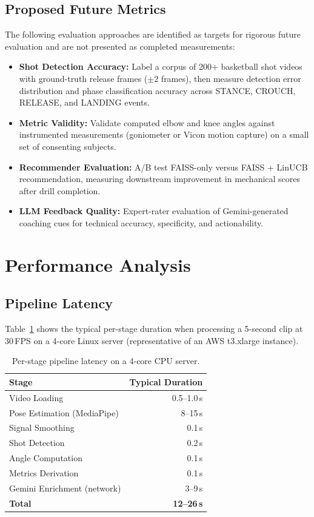 \subsection{Proposed Future Metrics}

The following evaluation approaches are identified as targets for rigorous future evaluation and are not presented as completed measurements:

\begin{itemize}
  \item \textbf{Shot Detection Accuracy:} Label a corpus of 200+ basketball shot videos with ground-truth release frames ($\pm 2$ frames), then measure detection error distribution and phase classification accuracy across STANCE, CROUCH, RELEASE, and LANDING events.
  \item \textbf{Metric Validity:} Validate computed elbow and knee angles against instrumented measurements (goniometer or Vicon motion capture) on a small set of consenting subjects.
  \item \textbf{Recommender Evaluation:} A/B test FAISS-only versus FAISS + LinUCB recommendation, measuring downstream improvement in mechanical scores after drill completion.
  \item \textbf{LLM Feedback Quality:} Expert-rater evaluation of Gemini-generated coaching cues for technical accuracy, specificity, and actionability.
\end{itemize}

\section{Performance Analysis}
\label{sec:performance}

\subsection{Pipeline Latency}

Table~\ref{tab:latency} shows the typical per-stage duration when processing a 5-second clip at 30\,FPS on a 4-core Linux server (representative of an AWS t3.xlarge instance).

\begin{table}[H]
  \centering
  \caption{Per-stage pipeline latency on a 4-core CPU server.}
  \label{tab:latency}
  \begin{tabular}{lr}
    \toprule
    \textbf{Stage} & \textbf{Typical Duration} \\
    \midrule
    Video Loading & 0.5--1.0\,s \\
    Pose Estimation (MediaPipe) & 8--15\,s \\
    Signal Smoothing & 0.1\,s \\
    Shot Detection & 0.2\,s \\
    Angle Computation & 0.1\,s \\
    Metrics Derivation & 0.1\,s \\
    Gemini Enrichment (network) & 3--9\,s \\
    \midrule
    \textbf{Total} & \textbf{12--26\,s} \\
    \bottomrule
  \end{tabular}
\end{table}

